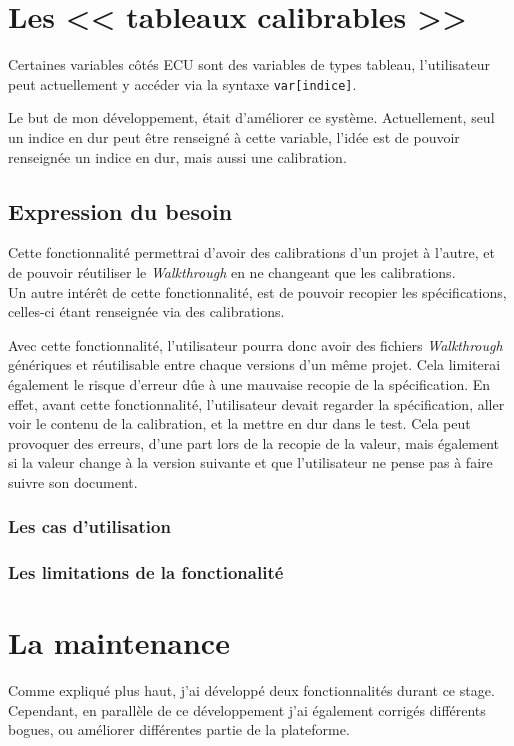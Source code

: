 \section{Les << tableaux calibrables >>}
Certaines variables côtés ECU sont des variables de types tableau, l’utilisateur peut actuellement y accéder via la syntaxe \texttt{var[indice]}.

Le but de mon développement, était d’améliorer ce système. Actuellement, seul un indice en dur peut être renseigné à cette variable, l’idée est de pouvoir renseignée un indice en dur, mais aussi une calibration.

\subsection{Expression du besoin}\label{besoinTab}
Cette fonctionnalité permettrai d’avoir des calibrations d’un projet à l’autre, et de pouvoir réutiliser le \textit{Walkthrough} en ne changeant que les calibrations.\\
Un autre intérêt de cette fonctionnalité, est de pouvoir recopier les spécifications, celles-ci étant renseignée via des calibrations.

Avec cette fonctionnalité, l'utilisateur pourra donc avoir des fichiers \textit{Walkthrough} génériques et réutilisable entre chaque versions d'un même projet. Cela limiterai également le risque d'erreur dûe à une mauvaise recopie de la spécification. En effet, avant cette fonctionnalité, l'utilisateur devait regarder la spécification, aller voir le contenu de la calibration, et la mettre en dur dans le test. Cela peut provoquer des erreurs, d'une part lors de la recopie de la valeur, mais également si la valeur change à la version suivante et que l'utilisateur ne pense pas à faire suivre son document. 

\subsubsection{Les cas d'utilisation}
\subsubsection{Les limitations de la fonctionalité}


\section{La maintenance}
Comme expliqué plus haut, j'ai développé deux fonctionnalités durant ce stage. Cependant, en parallèle de ce développement j'ai également corrigés différents bogues, ou améliorer différentes partie de la plateforme.


